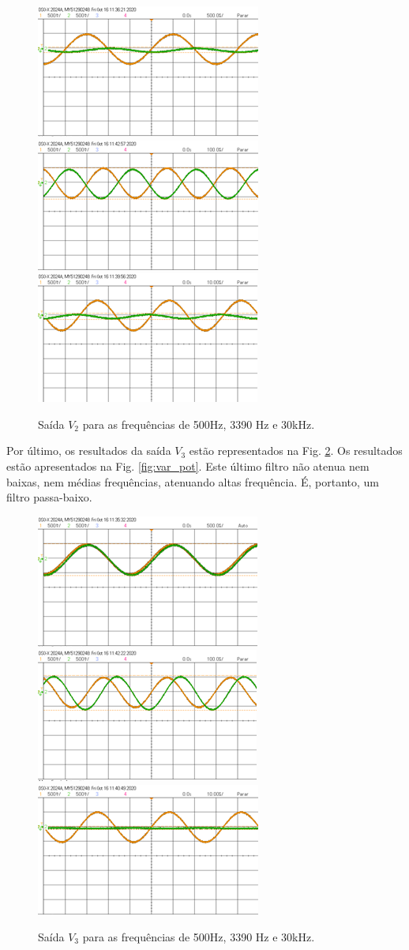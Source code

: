 \begin{figure}[h!]
\centering
\includegraphics[width=.325\textwidth]{Imagens/v2_baixa_KNH.png}
\includegraphics[width=.325\textwidth]{Imagens/v2_media_KNH.png}
\includegraphics[width=.325\textwidth]{Imagens/v2_alta_KNH.png}
\caption{Saída $V_2$ para as frequências de 500Hz, 3390 Hz e 30kHz.}
\label{saídas_v2}
\end{figure}

Por último, os resultados da saída $V_3$ estão representados na Fig. \ref{saídas_v3}. Os resultados estão apresentados na Fig. \ref{fig:var_pot}. Este último filtro não atenua nem baixas, nem médias frequências, atenuando altas frequência. É, portanto, um {filtro passa-baixo}.

\begin{figure}[h!]
\centering
\includegraphics[width=.325\textwidth]{Imagens/v3_baixa_KNH.png}
\includegraphics[width=.325\textwidth]{Imagens/v3_media_KNH.png}
\includegraphics[width=.325\textwidth]{Imagens/v3_alta_KNH.png}
\caption{Saída $V_3$ para as frequências de 500Hz, 3390 Hz e 30kHz.}
\label{saídas_v3}
\end{figure}

